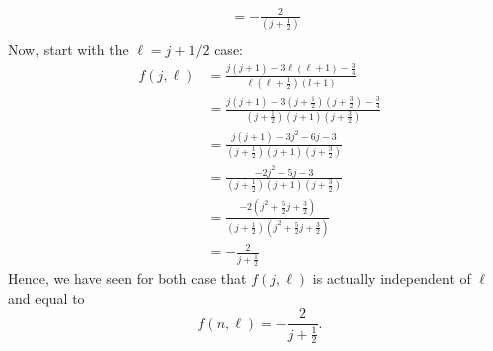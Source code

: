 \documentclass[10pt]{article}
\begin{document}
\begin{enumerate}
\begin{enumerate}
\begin{align*}
      &= - \frac{ 2  }{ \left( j+\frac{1}{2} \right)} \\
    \end{align*}
    Now, start with the $ \ell = j + 1/2 $ case:
    \begin{align*}
      f (j, \ell) &= \frac{j \left( j+1 \right) - 3 \ell \left( \ell + 1 \right) - \frac{3}{4}}{\ell \left(  \ell + \frac{1}{2} \right)\left( l+1 \right)} \\
      &= \frac{j \left( j+1 \right) - 3 \left( j + \frac{1}{2} \right) \left( j + \frac{3}{2} \right) - \frac{3}{4}}{\left( j + \frac{1}{2} \right) \left(  j + 1 \right)\left( j+\frac{3}{2} \right)} \\
      &= \frac{j \left( j+1 \right) - 3  j^2 - 6 j - 3 }{\left( j + \frac{1}{2} \right) \left(  j + 1 \right)\left( j+\frac{3}{2} \right)} \\
      &= \frac{-2 j ^2 - 5 j - 3}{\left( j + \frac{1}{2} \right) \left(  j + 1 \right)\left( j+\frac{3}{2} \right)} \\
      &= \frac{-2 \left( j^2 + \frac{5}{2} j + \frac{3}{2} \right)}{\left( j + \frac{1}{2} \right) \left(  j^2 + \frac{5}{2} j + \frac{3}{2} \right)} \\
      &= -\frac{2}{j + \frac{1}{2}}
    \end{align*}
    Hence, we have seen for both case that $ f(j, \ell) $ is actually independent of $ \ell $ and equal to 
    \[
      f (n, \ell) = - \frac{2}{j + \frac{1}{2}}.
    \]
  \end{enumerate}
\end{enumerate}
\end{document}
